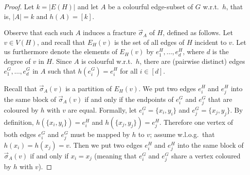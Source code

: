 \documentclass[authorcolumns,numberwithinsect]{no-lipics-v2022}
\begin{document}
\begin{proof}
    Let $k=|E(H)|$ and let $A$ be a colourful edge-subset of $G$ w.r.t.\ $h$, that is, $|A|=k$ and $h(A)=[k]$. 

    Observe that each such $A$ induces a fracture $\vec{\sigma}_A$ of $H$, defined as follows. Let $v\in V(H)$, and recall that $E_H(v)$ is the set of all edges of $H$ incident to $v$.
    Let us furthermore denote the elements of $E_H(v)$ by $e^H_1,\dots,e^H_d$, where $d$ is the degree of $v$ in $H$. Since $A$ is colourful w.r.t.\ $h$, there are (pairwise distinct) edges $e^G_1,\dots,e^G_d$ in $A$ such that $h(e^G_i)=e^H_i$ for all $i\in[d]$.
    
    Recall that $\vec{\sigma}_A(v)$ is a partition of $E_H(v)$. We put two edges $e^H_i$ and $e^H_j$ into the same block of $\vec{\sigma}_A(v)$ if and only if the endpoints of $e^G_i$ and $e^G_j$ that are coloured by $h$ with $v$ are equal. Formally, let $e^G_i=\{x_i,y_i\}$ and $e^G_j=\{x_j,y_j\}$. By definition, $h(\{x_i,y_i\})=e^H_i$ and $h(\{x_j,y_j\})=e^H_j$. Therefore one vertex of both edges $e^G_i$ and $e^G_j$ must be mapped by $h$ to $v$; assume w.l.o.g.\ that $h(x_i)=h(x_j)=v$. Then we put two edges $e^H_i$ and $e^H_j$ into the same block of $\vec{\sigma}_A(v)$ if and only if $x_i=x_j$ (meaning that $e^G_i$ and $e^G_j$ share a vertex coloured by $h$ with $v$).


\end{proof}
\end{document}
